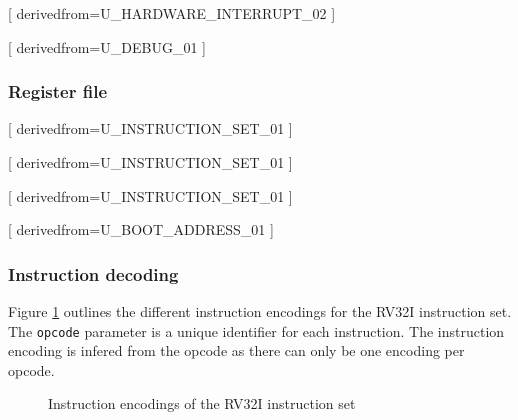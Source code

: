       [
          derivedfrom=U\_HARDWARE\_INTERRUPT\_02
        ]

      [
          derivedfrom=U\_DEBUG\_01
        ]

    \subsubsection{Register file}

      [
          derivedfrom=U\_INSTRUCTION\_SET\_01
        ]

      [
          derivedfrom=U\_INSTRUCTION\_SET\_01
        ]

      [
          derivedfrom=U\_INSTRUCTION\_SET\_01
        ]

    [
        derivedfrom=U\_BOOT\_ADDRESS\_01
      ]

    \subsubsection{Instruction decoding}

      \begin{content}
          Figure \ref{fig:instructionencoding} outlines the different instruction encodings for the RV32I instruction set. The \texttt{opcode} parameter is a unique identifier for each instruction. The instruction encoding is infered from the opcode as there can only be one encoding per opcode.
        \end{content}

      \begin{figure}[H]
          \centering
          
          \caption{Instruction encodings of the RV32I instruction set}
          \label{fig:instructionencoding}
        \end{figure}

